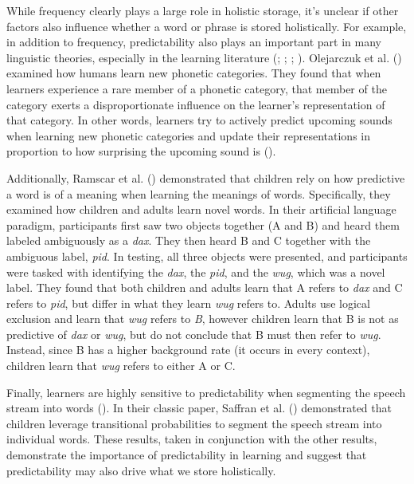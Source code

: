\documentclass[
  12pt,
  letterpaper,
]{scrreprt}
\begin{document}
While frequency clearly plays a large role in holistic storage, it's
unclear if other factors also influence whether a word or phrase is
stored holistically. For example, in addition to frequency,
predictability also plays an important part in many linguistic theories,
especially in the learning literature
(;
;
; ). Olejarczuk et al.
()
examined how humans learn new phonetic categories. They found that when
learners experience a rare member of a phonetic category, that member of
the category exerts a disproportionate influence on the learner's
representation of that category. In other words, learners try to
actively predict upcoming sounds when learning new phonetic categories
and update their representations in proportion to how surprising the
upcoming sound is
().

Additionally, Ramscar et al.
()
demonstrated that children rely on how predictive a word is of a meaning
when learning the meanings of words. Specifically, they examined how
children and adults learn novel words. In their artificial language
paradigm, participants first saw two objects together (A and B) and
heard them labeled ambiguously as a \emph{dax}. They then heard B and C
together with the ambiguous label, \emph{pid}. In testing, all three
objects were presented, and participants were tasked with identifying
the \emph{dax}, the \emph{pid}, and the \emph{wug}, which was a novel
label. They found that both children and adults learn that A refers to
\emph{dax} and C refers to \emph{pid}, but differ in what they learn
\emph{wug} refers to. Adults use logical exclusion and learn that
\emph{wug} refers to \emph{B}, however children learn that B is not as
predictive of \emph{dax} or \emph{wug}, but do not conclude that B must
then refer to \emph{wug}. Instead, since B has a higher background rate
(it occurs in every context), children learn that \emph{wug} refers to
either A or C.

Finally, learners are highly sensitive to predictability when segmenting
the speech stream into words
(). In their classic paper, Saffran et al.
()
demonstrated that children leverage transitional probabilities to
segment the speech stream into individual words. These results, taken in
conjunction with the other results, demonstrate the importance of
predictability in learning and suggest that predictability may also
drive what we store holistically.
\end{document}
